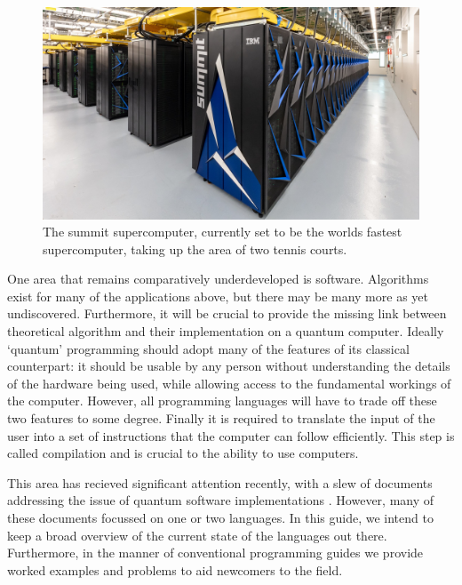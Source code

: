 \begin{figure}
    \centering
    \includegraphics[width=\linewidth]{figures/SummitSC.jpg}
    \caption{The summit supercomputer, currently set to be the worlds fastest supercomputer, taking up the area of two tennis courts. \cite{SummitSC}}
    \label{fig:Summit}
\end{figure}

One area that remains comparatively underdeveloped is software. Algorithms exist for many of the applications above, but there may be many more as yet undiscovered. Furthermore, it will be crucial to provide the missing link between theoretical algorithm and their implementation on a quantum computer. Ideally `quantum' programming should adopt many of the features of its classical counterpart: it should be usable by any person without understanding the details of the hardware being used, while allowing access to the fundamental workings of the computer. However, all programming languages will have to trade off these two features to some degree. Finally it is required to translate the input of the user into a set of instructions that the computer can follow efficiently. This step is called compilation and is crucial to the ability to use computers.

This area has recieved significant attention recently, with a slew of documents addressing the issue of quantum software implementations  \cite{AlamosIBM2018, Xanadu2018, DK2018, DKBlog, RL2018, JW2018}. However, many of these documents focussed on one or two languages. In this guide, we intend to keep a broad overview of the current state of the languages out there. Furthermore, in the manner of conventional programming guides we provide worked examples and problems to aid newcomers to the field. 

